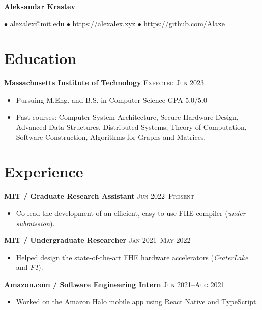 \documentclass[letterpaper,11pt]{article}
\author{Aleksandar Krastev}
\date{2020-12-21}
\begin{document}
\setlength{\belowdisplayskip}{\parskip}
\setlength{\belowdisplayshortskip}{\belowdisplayskip}
\setlength{\abovedisplayskip}{\parskip}
\setlength{\abovedisplayshortskip}{\abovedisplayskip}

\centerline{{\Huge \bf Aleksandar Krastev}}
$\bullet$ \href{mailto:alexalex@mit.edu}{alexalex@mit.edu} \hfill
$\bullet$ \href{https://alexalex.xyz}{https://alexalex.xyz} \hfill
$\bullet$ \href{https://github.com/Alaxe}{https://github.com/Alaxe} \hfill

\section*{Education}
\textbf{Massachusetts Institute of Technology}
\hfill
\textsc{Expected Jun 2023}

\begin{itemize}
    \item Pursuing M.Eng. and B.S. in Computer Science
        \hfill \textsc{GPA 5.0/5.0}
    \item Past courses:
        Computer System Architecture,
        Secure Hardware Design,
        Advanced Data Structures,
        Distributed Systems,
        Theory of Computation,
        Software Construction,
        Algorithms for Graphs and Matrices.
\end{itemize}



\section*{Experience}
\textbf{MIT / Graduate Research Assistant}
\hfill
\textsc{Jun 2022--Present}
\begin{itemize}
    \item Co-lead the development of an efficient, easy-to use FHE compiler
        (\emph{under submission}).
\end{itemize}

\textbf{MIT / Undergraduate Researcher}
\hfill
\textsc{Jan 2021--May 2022}
\begin{itemize}
    \item Helped design the state-of-the-art FHE hardware accelerators
        (\emph{CraterLake} and \emph{F1}).
\end{itemize}

\textbf{Amazon.com / Software Engineering Intern}
\hfill
\textsc{Jun 2021--Aug 2021}
\begin{itemize}
    \item Worked on the Amazon Halo mobile app using React Native and TypeScript.
\end{itemize}
\end{document}
